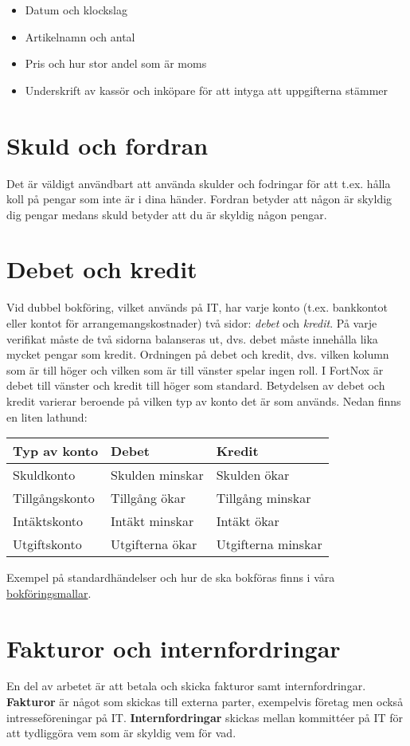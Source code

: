 \documentclass{article}
\begin{document}
\begin{itemize}
    \item Datum och klockslag
    \item Artikelnamn och antal
    \item Pris och hur stor andel som är moms
    \item Underskrift av kassör och inköpare för att intyga att uppgifterna stämmer
\end{itemize}

\section{Skuld och fordran}
Det är väldigt användbart att använda skulder och fodringar för att t.ex. hålla koll på pengar
som inte är i dina händer. Fordran betyder att någon är skyldig dig pengar medans skuld
betyder att du är skyldig någon pengar.

\section{Debet och kredit}
\label{sec:debit-kredit}
Vid dubbel bokföring, vilket används på IT, har varje konto (t.ex. bankkontot eller kontot för
arrangemangskostnader) två sidor: \textit{debet} och \textit{kredit}. På varje verifikat måste de två sidorna
balanseras ut, dvs. debet måste innehålla lika mycket pengar som kredit. Ordningen på debet
och kredit, dvs. vilken kolumn som är till höger och vilken som är till vänster spelar ingen
roll. I FortNox är debet till vänster och kredit till höger som standard.
Betydelsen av debet och kredit varierar beroende på vilken typ av konto det är som
används. Nedan finns en liten lathund:


\begin{tabular}{ l | l | l }
\hline
Typ av konto & Debet & Kredit \\
\hline
Skuldkonto & Skulden minskar & Skulden ökar \\
Tillgångskonto & Tillgång ökar & Tillgång minskar \\
Intäktskonto & Intäkt minskar & Intäkt ökar \\
Utgiftskonto & Utgifterna ökar & Utgifterna minskar
\end{tabular}

Exempel på standardhändelser och hur de ska bokföras finns i våra \href{https://styrit.chalmers.it/wp-content/uploads/bokforingsmall.pdf}{bokföringsmallar}. 

\section{Fakturor och internfordringar}
\label{sec:faktura}
En del av arbetet är att betala och skicka fakturor samt internfordringar. \textbf{Fakturor} är något som skickas till externa parter, exempelvis företag men också intresseföreningar på IT. \textbf{Internfordringar} skickas mellan kommittéer på IT för att tydliggöra vem som är skyldig vem för vad.
\end{document}
